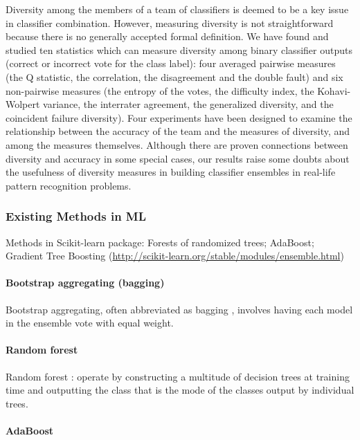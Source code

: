 \cite{kuncheva2003measures} Diversity among the members of a team of classifiers is deemed to be a key issue in classifier
combination. However, measuring diversity is not straightforward because there is no generally accepted formal
definition. We have found and studied ten statistics which can measure diversity among binary classifier outputs
(correct or incorrect vote for the class label): four averaged pairwise measures (the Q statistic, the correlation,
the disagreement and the double fault) and six non-pairwise measures (the entropy of the votes, the difficulty
index, the Kohavi-Wolpert variance, the interrater agreement, the generalized diversity, and the coincident failure
diversity). Four experiments have been designed to examine the relationship between the accuracy of the team and
the measures of diversity, and among the measures themselves. Although there are proven connections between
diversity and accuracy in some special cases, our results raise some doubts about the usefulness of diversity
measures in building classifier ensembles in real-life pattern recognition problems.


\subsubsection{Existing Methods in ML}

Methods in Scikit-learn package: Forests of randomized trees; AdaBoost; Gradient Tree Boosting  (\url{http://scikit-learn.org/stable/modules/ensemble.html})

\paragraph{Bootstrap aggregating (bagging)}
Bootstrap aggregating, often abbreviated as bagging \cite{breiman1996bagging}, involves having each model in the ensemble vote with equal weight.

\paragraph{Random forest}

Random forest \cite{breiman2001random}: operate by constructing a multitude of decision trees at training time and outputting the class that is the mode of the classes output by individual trees. 

\paragraph{AdaBoost}

